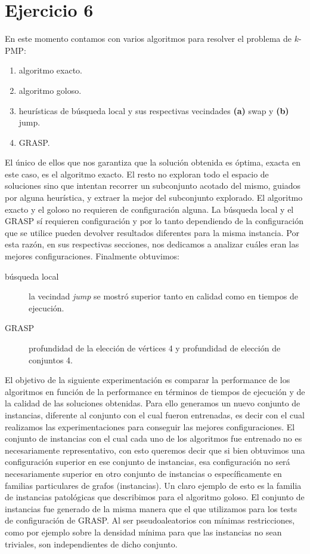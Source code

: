\section{Ejercicio 6} 

En este momento contamos con varios algoritmos para resolver el problema de $k$-PMP:
\begin{enumerate}
  \item algoritmo exacto.
  \item algoritmo goloso.
  \item heurísticas de búsqueda local y sus respectivas vecindades \textbf{(a)} swap y \textbf{(b)} jump.
  \item GRASP.
\end{enumerate}
El único de ellos que nos garantiza que la solución obtenida es óptima, exacta en este caso, es el algoritmo exacto.
El resto no exploran todo el espacio de soluciones sino que intentan recorrer un subconjunto acotado del mismo,
guiados por alguna heurística, y extraer la mejor del subconjunto explorado. El algoritmo exacto y el goloso
no requieren de configuración alguna. La búsqueda local y el GRASP sí requieren configuración y por lo tanto
dependiendo de la configuración que se utilice pueden devolver resultados diferentes para la misma instancia.
Por esta razón, en sus respectivas secciones, nos dedicamos a analizar cuáles eran las mejores configuraciones.
Finalmente obtuvimos:
\begin{description}
  \item[búsqueda local] la vecindad \textit{jump} se mostró superior tanto en calidad como en tiempos de ejecución.
  \item[GRASP] profundidad de la elección de vértices 4 y profundidad de elección de conjuntos 4. 
\end{description}
El objetivo de la siguiente experimentación es comparar la performance de los algoritmos en función de la
performance en términos de tiempos de ejecución y de la calidad de las soluciones obtenidas. Para ello
generamos un nuevo conjunto de instancias, diferente al conjunto con el cual fueron entrenadas, es decir
con el cual realizamos las experimentaciones para conseguir las mejores configuraciones. El conjunto de
instancias con el cual cada uno de los algoritmos fue entrenado no es necesariamente representativo, con
esto queremos decir que si bien obtuvimos una configuración superior en ese conjunto de instancias, esa
configuración no será necesariamente superior en otro conjunto de instancias o específicamente en 
familias particulares de grafos (instancias). Un claro ejemplo de esto es la familia de instancias
patológicas que describimos para el algoritmo goloso.
El conjunto de instancias fue generado de la misma manera que el que utilizamos para los tests de configuración
de GRASP. Al ser pseudoaleatorios con mínimas restricciones, como por ejemplo sobre la densidad mínima para que
las instancias no sean triviales, son independientes de dicho conjunto.

